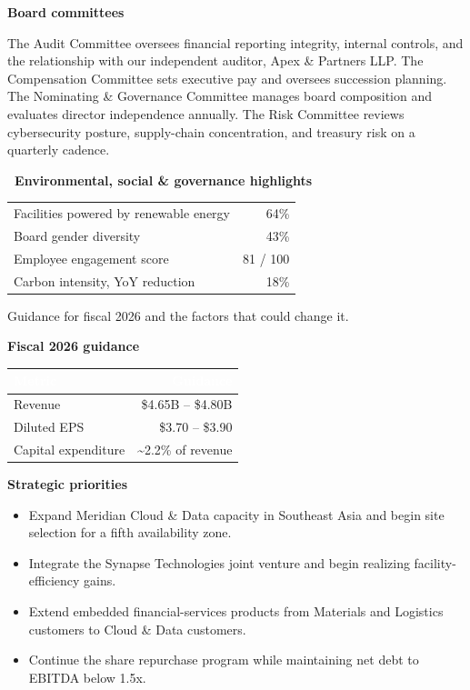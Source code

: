 \documentclass[11pt,oneside,a4paper]{scrbook}
\newcommand{\goldrule}{\noindent{\color{merGold}\rule{\linewidth}{1.1pt}}\par\vspace{2pt}\noindent{\color{merNavy!25}\rule{\linewidth}{0.4pt}}\vspace{10pt}\par}
\newcommand{\sectionlede}[1]{{\color{merSlate}\large #1}\par\vspace{6pt}}
\begin{document}
\vspace{16pt}
{\bfseries\color{merNavy} Board committees}\par
The Audit Committee oversees financial reporting integrity, internal controls, and the relationship with our independent auditor, Apex \& Partners LLP. The Compensation Committee sets executive pay and oversees succession planning. The Nominating \& Governance Committee manages board composition and evaluates director independence annually. The Risk Committee reviews cybersecurity posture, supply-chain concentration, and treasury risk on a quarterly cadence.

\vspace{14pt}
\begin{esgbox}
{\bfseries\color{merNavy}\faLeaf\ Environmental, social \& governance highlights}\\[6pt]
\begin{tabularx}{\linewidth}{@{}Xr@{}}
Facilities powered by renewable energy & 64\% \\
Board gender diversity & 43\% \\
Employee engagement score & 81 / 100 \\
Carbon intensity, YoY reduction & 18\% \\
\end{tabularx}
\end{esgbox}

\goldrule

\sectionlede{Guidance for fiscal 2026 and the factors that could change it.}

{\bfseries\color{merNavy} Fiscal 2026 guidance}\par
\begin{tabular}{lr}
\toprule
\rowcolor{merNavy}
\textcolor{white}{\bfseries Metric} & \textcolor{white}{\bfseries Guidance} \\
\midrule
Revenue & \$4.65B -- \$4.80B \\
Diluted EPS & \$3.70 -- \$3.90 \\
Capital expenditure & \textasciitilde 2.2\% of revenue \\
\bottomrule
\end{tabular}

\vspace{14pt}
{\bfseries\color{merNavy} Strategic priorities}\par
\begin{itemize}[leftmargin=1.4em,label={\color{merGold}\faBullseye}]
\item Expand Meridian Cloud \& Data capacity in Southeast Asia and begin site selection for a fifth availability zone.
\item Integrate the Synapse Technologies joint venture and begin realizing facility-efficiency gains.
\item Extend embedded financial-services products from Materials and Logistics customers to Cloud \& Data customers.
\item Continue the share repurchase program while maintaining net debt to EBITDA below 1.5x.
\end{itemize}
\end{document}
